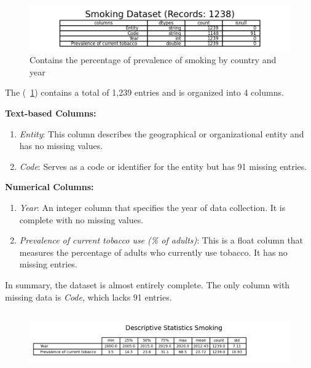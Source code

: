         \subsection{\duDescribeTheData}
            \begin{figure}[H]
                \centering
                \includegraphics[scale=1.3]{images/du_smoking_dataset}
                \caption{Contains the percentage of prevalence of smoking by country and year}
                \label{fig:du-smoking-datasets}
            \end{figure}

            The \textit{\dsSmoking} (\figurename~\ref{fig:du-smoking-datasets}) contains a total of 1,239 entries and is organized into 4 columns.

            \textbf{Text-based Columns:}
            \begin{enumerate}
                \item \textit{Entity}: This column describes the geographical or organizational entity and has no missing values.
                \item \textit{Code}: Serves as a code or identifier for the entity but has 91 missing entries.
            \end{enumerate}

            \textbf{Numerical Columns:}
            \begin{enumerate}
                \item \textit{Year}: An integer column that specifies the year of data collection. It is complete with no missing values.
                \item \textit{Prevalence of current tobacco use (\% of adults)}: This is a float column that measures the percentage of adults who currently use tobacco. It has no missing entries.
            \end{enumerate}

            In summary, the dataset is almost entirely complete. The only column with missing data is \textit{Code}, which lacks 91 entries.

        \subsection{\duExploreTheData}
            \begin{figure}[H]
                \centering
                \includegraphics[scale=1]{images/du_smoking_summary}
                \caption{}
                \label{fig:du-smoking-summary}
            \end{figure}


